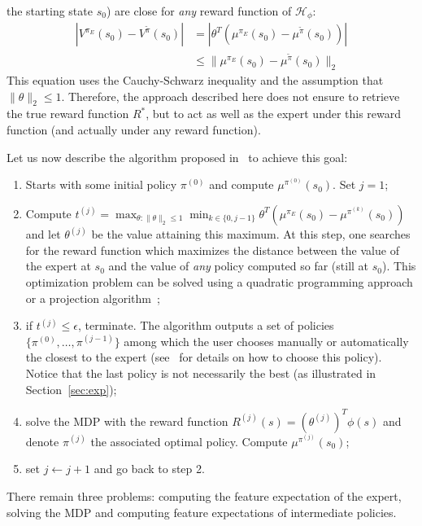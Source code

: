 \documentclass{llncs}
\begin{document}
the starting state $s_0$) are close for \emph{any} reward function
of $\mathcal{H}_\phi$:
\begin{align}
  |V^{\pi_E}(s_0) - V^{\tilde{\pi}}(s_0)| &=
  |\theta^T(\mu^{\pi_E}(s_0)-\mu^{\tilde{\pi}}(s_0))|
  \label{eqn:vs0}
  \\
  &\leq \|\mu^{\pi_E}(s_0)-\mu^{\tilde{\pi}}(s_0)\|_2
\end{align}
This equation uses the Cauchy-Schwarz inequality and the
assumption that $\|\theta\|_2\leq 1$. Therefore, the approach
described here does not ensure to retrieve the true reward function
$R^*$, but to act as well as the expert under this reward function
(and actually under any reward function).

Let us now describe the algorithm proposed in~\citep{abbeel2004apprenticeship} to
achieve this goal:
\begin{enumerate}
  \item Starts with some initial policy $\pi^{(0)}$ and compute
  $\mu^{\pi^{(0)}}(s_0)$. Set $j=1$;
  \item Compute $t^{(j)} = \max_{\theta: \|\theta\|_2\leq 1}
  \min_{k\in\{0,j-1\}}\theta^T(\mu^{\pi_E}(s_0) -
  \mu^{\pi^{(k)}}(s_0))$ and let $\theta^{(j)}$ be the value
  attaining this maximum. At this step, one searches for the reward
  function which maximizes the distance between the value of the
  expert at $s_0$ and the value of \emph{any} policy computed so far
  (still at $s_0$). This optimization problem can be solved using a
  quadratic programming approach or a projection
  algorithm~\citep{abbeel2004apprenticeship};
  \item if $t^{(j)}\leq \epsilon$, terminate. The algorithm outputs a
  set of policies $\{\pi^{(0)}, \dots, \pi^{(j-1)}\}$ among which
  the user chooses manually or automatically the closest to the
  expert (see~\citep{abbeel2004apprenticeship} for details on how to choose this
  policy).
  Notice that the last policy is not necessarily the best (as illustrated in Section~\ref{sec:exp});
  \item solve the MDP with the reward function $R^{(j)}(s) =
  (\theta^{(j)})^T\phi(s)$ and denote $\pi^{(j)}$ the associated
  optimal policy. Compute $\mu^{\pi^{(j)}}(s_0)$;
  \item set $j\leftarrow j+1$ and go back to step 2.
\end{enumerate}
There remain three problems: computing the feature expectation of
the expert, solving the MDP and computing feature expectations of
intermediate policies.
\end{document}
